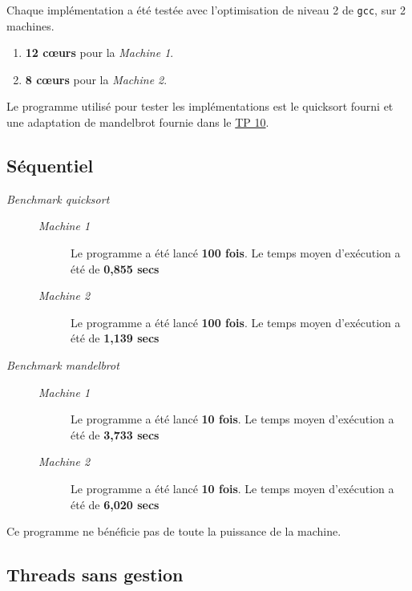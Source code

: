 \documentclass[a4paper]{article}
\def\coeur{c\oe{}ur}
\def\mone{\textit{Machine 1}} %
\def\mtwo{\textit{Machine 2}} %
\def\bone{\textit{Benchmark quicksort}}
\def\btwo{\textit{Benchmark mandelbrot}}
\begin{document}
Chaque implémentation a été testée avec l'optimisation de niveau 2
de \texttt{gcc}, sur 2 machines.

\begin{enumerate}
  \item \textbf{12 \coeur{}s} pour la \mone.
  \item \textbf{8 \coeur{}s} pour la \mtwo.
\end{enumerate}

Le programme utilisé pour tester les implémentations est le quicksort fourni
et une adaptation de mandelbrot fournie dans le
\href{https://www.irif.fr/~jch/enseignement/systeme/tp10.pdf}{TP 10}.

\subsection{Séquentiel}\label{stats:seq}
\begin{description}
  \item[\bone] \hspace{1em}
        \begin{description}
          \item[\mone] Le programme a été lancé \textbf{100 fois}.
                Le temps moyen d'exécution a été de \textbf{0,855 secs}
          \item[\mtwo] Le programme a été lancé \textbf{100 fois}.
                Le temps moyen d'exécution a été de \textbf{1,139 secs}
        \end{description}

  \item[\btwo] \hspace{1em}
        \begin{description}
          \item[\mone] Le programme a été lancé \textbf{10 fois}.
                Le temps moyen d'exécution a été de \textbf{3,733 secs}
          \item[\mtwo] Le programme a été lancé \textbf{10 fois}.
                Le temps moyen d'exécution a été de \textbf{6,020 secs}
        \end{description}
\end{description}


Ce programme ne bénéficie pas de toute la puissance de la machine.

\subsection{Threads sans gestion}\label{stats:th_ges}
\end{document}
